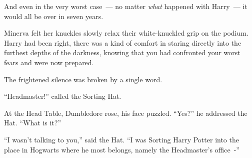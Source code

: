 And even in the very worst case~--- no matter \emph{what} happened with Harry~--- it would all be over in seven years.

Minerva felt her knuckles slowly relax their white-knuckled grip on the podium. Harry had been right, there was a kind of comfort in staring directly into the furthest depths of the darkness, knowing that you had confronted your worst fears and were now prepared.

The frightened silence was broken by a single word.

``Headmaster!'' called the Sorting Hat.

At the Head Table, Dumbledore rose, his face puzzled. ``Yes?'' he addressed the Hat. ``What is it?''

``I wasn't talking to you,'' said the Hat. ``I was Sorting Harry Potter into the place in Hogwarts where he most belongs, namely the Headmaster's office~-''
